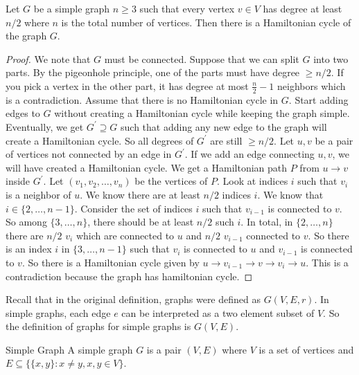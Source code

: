 \documentclass{report}
\begin{document}
\begin{theorem}{}
    Let $G$ be a simple graph $n \geq 3$ such that every vertex $v \in V$ has degree at least $n/2$ where $n$ is the total number of vertices. Then there is a Hamiltonian cycle of the graph $G$.
\end{theorem} 
    \begin{proof}
        We note that $G$ must be connected. Suppose that we can split $G$ into two parts. By the pigeonhole principle, one of the parts must have degree $\geq n/2$. If you pick a vertex in the other part, it has degree at most $\frac{n}{2} - 1$ neighbors which is a contradiction. Assume that there is no Hamiltonian cycle in $G$. Start adding edges to $G$ without creating a Hamiltonian cycle while keeping the graph simple. Eventually, we get $G^{\prime}  \supseteq G$ such that adding any new edge to the graph will create a Hamiltonian cycle. So all degrees of $G^{\prime}$ are still $\geq n/2$. Let $u, v$ be a pair of vertices not connected by an edge in $G^{\prime}$. If we add an edge connecting $u, v$, we will have created a Hamiltonian cycle. We get a Hamiltonian path $P$ from $u \rightarrow v$ inside $G^{\prime}$. Let $(v_{1}, v_{2}, \ldots, v_{n})$ be the vertices of $P$. Look at indices $i$ such that $v_{i}$ is a neighbor of $u$. We know there are at least $n/2$ indices $i$. We know that $i \in\{2, \ldots, n - 1\}$. Consider the set of indices $i$ such that $v_{i - 1}$ is connected to $v$. So among $\{3, \ldots, n\}$, there should be at least $n/2$ such $i$. In total, in $\{2, \ldots, n\}$ there are $n/2$ $v_{i}$ which are connected to $u$ and $n/2$ $v_{i - 1}$ connected to $v$. So there is an index $i$ in $\{3, \ldots, n - 1\}$ such that $v_{i}$ is connected to $u$ and $v_{i - 1}$ is connected to $v$. So there is a Hamiltonian cycle given by $u \rightarrow v_{i - 1} \rightarrow v \rightarrow v_{i} \rightarrow u$. This is a contradiction because the graph has hamiltonian cycle.
    \end{proof}

Recall that in the original definition, graphs were defined as $G(V, E, r)$. In simple graphs, each edge $e$ can be interpreted as a two element subset of $V$. So the definition of graphs for simple graphs is $G(V, E)$. 

\begin{definition}{Simple Graph}
    A simple graph $G$ is a pair $(V, E)$ where $V$ is a set of vertices and $E \subseteq \{\{x, y\} : x \neq y, x, y \in V\}$.
\end{definition}
\end{document}
